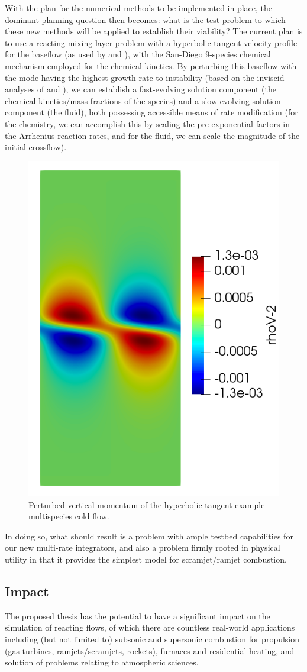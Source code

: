 With the plan for the numerical methods to be implemented in place, the dominant
planning question then becomes: what is the test problem to which these new methods will
be applied to establish their viability? The current plan is to use a reacting mixing layer
problem with a hyperbolic tangent velocity profile for the baseflow (as used by \cite{michalke1964inviscid}
and \cite{blumen1970shear}), with the San-Diego 9-species chemical mechanism employed for
the chemical kinetics. By perturbing this baseflow with the mode having the highest growth
rate to instability (based on the inviscid analyses of \cite{michalke1964inviscid} and
\cite{blumen1970shear}), we can establish a fast-evolving solution component (the chemical
kinetics/mass fractions of the species) and a slow-evolving solution component (the fluid),
both possessing accessible means of rate modification (for the chemistry, we can accomplish
this by scaling the pre-exponential factors in the Arrhenius reaction rates, and for the
fluid, we can scale the magnitude of the initial crossflow).

\begin{figure}
\centering
\includegraphics[width=0.3\linewidth,trim=4 4 4 4,clip]{figures/hyperbolic_tangent.png}
\caption{Perturbed vertical momentum of the hyperbolic tangent example - multispecies cold flow.}
\label{fig:hyperbolic_cold_rhov2}
\end{figure}

In doing so, what should result is a problem with ample testbed capabilities for our
new multi-rate integrators, and also a problem firmly rooted in physical utility in that
it provides the simplest model for scramjet/ramjet combustion.

\subsection{Impact}

The proposed thesis has the potential to have a significant impact on the
simulation of reacting flows, of which there are countless real-world applications
including (but not limited to) subsonic and supersonic combustion for propulsion
(gas turbines, ramjets/scramjets, rockets), furnaces and residential heating, and
solution of problems relating to atmospheric sciences.

